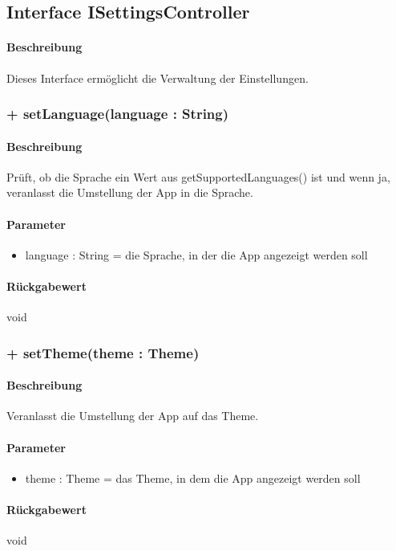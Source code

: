 \subsection{Interface ISettingsController}
\paragraph*{Beschreibung}
Dieses Interface ermöglicht die Verwaltung der Einstellungen.

\subsubsection{+ setLanguage(language : String)}%
\paragraph*{Beschreibung}
Prüft, ob die Sprache ein Wert aus getSupportedLanguages() ist und wenn ja, veranlasst die Umstellung der App in die Sprache.
\paragraph*{Parameter}
\begin{itemize}
    \item language : String = die Sprache, in der die App angezeigt werden soll
\end{itemize}
\paragraph*{Rückgabewert}
void

\subsubsection{+ setTheme(theme : Theme)}%
\paragraph*{Beschreibung}
Veranlasst die Umstellung der App auf das Theme.
\paragraph*{Parameter}
\begin{itemize}
    \item theme : Theme = das Theme, in dem die App angezeigt werden soll
\end{itemize}
\paragraph*{Rückgabewert}
void

